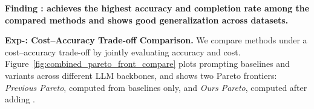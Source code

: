 %


\begin{shaded}
\noindent \textbf{Finding \findingnum: \sys achieves the highest accuracy and completion rate among the compared methods and shows good generalization across datasets.}
\end{shaded}


\noindent
\textbf{Exp-\expnum\label{exp:prompting_comparison}: Cost–Accuracy Trade-off Comparison.}
We compare methods under a cost–accuracy trade-off by jointly evaluating accuracy and cost. Figure~\ref{fig:combined_pareto_front_compare} plots prompting baselines and \sys variants across different LLM backbones, and shows two Pareto frontiers: \textit{Previous Pareto}, computed from baselines only, and \textit{Ours Pareto}, computed after adding \sys.


